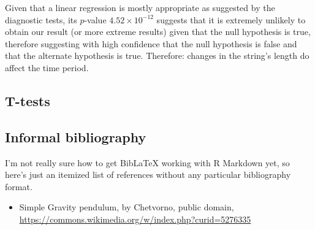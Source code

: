 \documentclass[
]{article}
\providecommand{\tightlist}{%
  \setlength{\itemsep}{0pt}\setlength{\parskip}{0pt}}
\begin{document}
Given that a linear regression is mostly appropriate as suggested by the
diagnostic tests, its \(p\)-value \(4.52 \times 10^{-12}\) suggests that
it is extremely unlikely to obtain our result (or more extreme results)
given that the null hypothesis is true, therefore suggesting with high
confidence that the null hypothesis is false and that the alternate
hypothesis is true. Therefore: changes in the string's length do affect
the time period.

\subsection{T-tests}\label{t-tests}

\subsection{Informal bibliography}\label{informal-bibliography}

I'm not really sure how to get BibLaTeX working with R Markdown yet, so
here's just an itemized list of references without any particular
bibliography format.

\begin{itemize}
\tightlist
\item
  Simple Gravity pendulum, by Chetvorno, public domain,
  \url{https://commons.wikimedia.org/w/index.php?curid=5276335}
\end{itemize}
\end{document}
